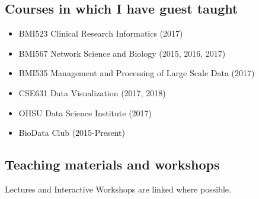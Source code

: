 \documentclass[11pt,]{article}
\providecommand{\tightlist}{%
  \setlength{\itemsep}{0pt}\setlength{\parskip}{0pt}}
\begin{document}
\subsection{Courses in which I have guest
taught}\label{courses-in-which-i-have-guest-taught}

\begin{itemize}
\tightlist
\item
  BMI523 Clinical Research Informatics (2017)
\item
  BMI567 Network Science and Biology (2015, 2016, 2017)
\item
  BMI535 Management and Processing of Large Scale Data (2017)
\item
  CSE631 Data Visualization (2017, 2018)
\item
  OHSU Data Science Institute (2017)
\item
  BioData Club (2015-Present)
\end{itemize}

\subsection{Teaching materials and
workshops}\label{teaching-materials-and-workshops}

Lectures and Interactive Workshops are linked where possible.
\end{document}

